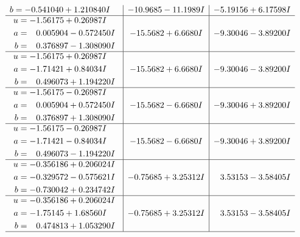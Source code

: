 \documentclass[1p]{elsarticle_modified}
\theoremstyle{definition}
\begin{document}
$$\begin{array}{c|c|c}
\begin{aligned}
b &= -0.541040 + 1.210840 I\end{aligned}
 & -10.9685 - 11.1989 I & -5.19156 + 6.17598 I \\ \hline\begin{aligned}
u &= -1.56175 + 0.26987 I \\
a &= \phantom{-}0.005904 - 0.572450 I \\
b &= \phantom{-}0.376897 - 1.308090 I\end{aligned}
 & -15.5682 + 6.6680 I & -9.30046 - 3.89200 I \\ \hline\begin{aligned}
u &= -1.56175 + 0.26987 I \\
a &= -1.71421 + 0.84034 I \\
b &= \phantom{-}0.496073 + 1.194220 I\end{aligned}
 & -15.5682 + 6.6680 I & -9.30046 - 3.89200 I \\ \hline\begin{aligned}
u &= -1.56175 - 0.26987 I \\
a &= \phantom{-}0.005904 + 0.572450 I \\
b &= \phantom{-}0.376897 + 1.308090 I\end{aligned}
 & -15.5682 - 6.6680 I & -9.30046 + 3.89200 I \\ \hline\begin{aligned}
u &= -1.56175 - 0.26987 I \\
a &= -1.71421 - 0.84034 I \\
b &= \phantom{-}0.496073 - 1.194220 I\end{aligned}
 & -15.5682 - 6.6680 I & -9.30046 + 3.89200 I \\ \hline\begin{aligned}
u &= -0.356186 + 0.206024 I \\
a &= -0.329572 - 0.575621 I \\
b &= -0.730042 + 0.234742 I\end{aligned}
 & -0.75685 + 3.25312 I & \phantom{-}3.53153 - 3.58405 I \\ \hline\begin{aligned}
u &= -0.356186 + 0.206024 I \\
a &= -1.75145 + 1.68560 I \\
b &= \phantom{-}0.474813 + 1.053290 I\end{aligned}
 & -0.75685 + 3.25312 I & \phantom{-}3.53153 - 3.58405 I\\
 \hline 
 \end{array}$$\newpage$$\begin{array}{c|c|c}  

\end{array}$$
\end{document}
